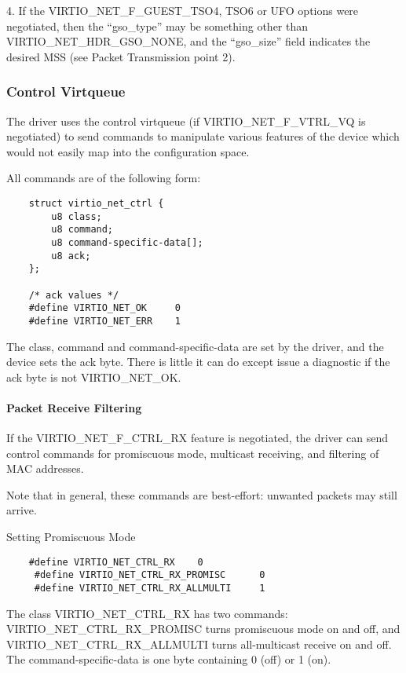 4. If the VIRTIO_NET_F_GUEST_TSO4, TSO6 or UFO options were
  negotiated, then the “gso_type” may be something other than
  VIRTIO_NET_HDR_GSO_NONE, and the “gso_size” field indicates the
  desired MSS (see Packet Transmission point 2).

\subsubsection{Control Virtqueue}\label{sec:Device Types / Network Device / Device Operation / Control Virtqueue}

The driver uses the control virtqueue (if VIRTIO_NET_F_VTRL_VQ is
negotiated) to send commands to manipulate various features of
the device which would not easily map into the configuration
space.

All commands are of the following form:

\begin{lstlisting}
	struct virtio_net_ctrl {
		u8 class;
		u8 command;
		u8 command-specific-data[];
		u8 ack;
	};

	/* ack values */
	#define VIRTIO_NET_OK     0
	#define VIRTIO_NET_ERR    1
\end{lstlisting}

The class, command and command-specific-data are set by the
driver, and the device sets the ack byte. There is little it can
do except issue a diagnostic if the ack byte is not
VIRTIO_NET_OK.

\paragraph{Packet Receive Filtering}\label{sec:Device Types / Network Device / Device Operation / Control Virtqueue / Packet Receive Filtering}

If the VIRTIO_NET_F_CTRL_RX feature is negotiated, the driver can
send control commands for promiscuous mode, multicast receiving,
and filtering of MAC addresses.

Note that in general, these commands are best-effort: unwanted
packets may still arrive.

Setting Promiscuous Mode

\begin{lstlisting}
	#define VIRTIO_NET_CTRL_RX    0
	 #define VIRTIO_NET_CTRL_RX_PROMISC      0
	 #define VIRTIO_NET_CTRL_RX_ALLMULTI     1
\end{lstlisting}

The class VIRTIO_NET_CTRL_RX has two commands:
VIRTIO_NET_CTRL_RX_PROMISC turns promiscuous mode on and off, and
VIRTIO_NET_CTRL_RX_ALLMULTI turns all-multicast receive on and
off. The command-specific-data is one byte containing 0 (off) or
1 (on).

